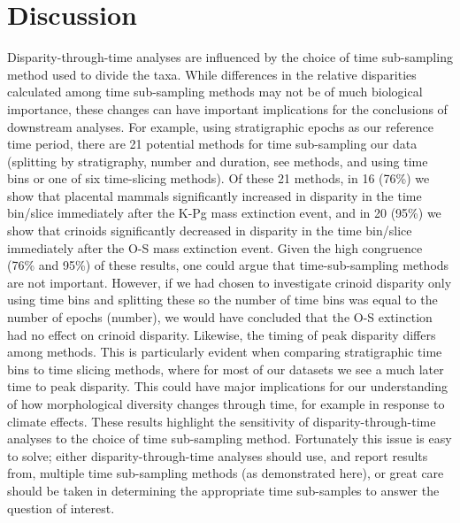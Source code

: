 \documentclass[12pt,a4paper]{article}
\begin{document}

\section{Discussion}
Disparity-through-time analyses are influenced by the choice of time sub-sampling method used to divide the taxa. 
While differences in the relative disparities calculated among time sub-sampling methods may not be of much biological importance, these changes can have important implications for the conclusions of downstream analyses. 
For example, using stratigraphic epochs as our reference time period, there are 21 potential methods for time sub-sampling our data (splitting by stratigraphy, number and duration, see methods, and using time bins or one of six time-slicing methods). 
Of these 21 methods, in 16 (76\%) we show that placental mammals \citep{beckancient2014} significantly increased in disparity in the time bin/slice immediately after the K-Pg mass extinction event, and in 20 (95\%) we show that crinoids \citep{wright2017bayesian} significantly decreased in disparity in the time bin/slice immediately after the O-S mass extinction event.
Given the high congruence (76\% and 95\%) of these results, one could argue that time-sub-sampling methods are not important. 
However, if we had chosen to investigate crinoid disparity only using time bins and splitting these so the number of time bins was equal to the number of epochs (number), we would have concluded that the O-S extinction had no effect on crinoid disparity. 
Likewise, the timing of peak disparity differs among methods. 
This is particularly evident when comparing stratigraphic time bins to time slicing methods, where for most of our datasets we see a much later time to peak disparity. 
This could have major implications for our understanding of how morphological diversity changes through time, for example in response to climate effects.
These results highlight the sensitivity of disparity-through-time analyses to the choice of time sub-sampling method. 
Fortunately this issue is easy to solve; either disparity-through-time analyses should use, and report results from, multiple time sub-sampling methods (as demonstrated here), or great care should be taken in determining the appropriate time sub-samples to answer the question of interest. 
\end{document}
